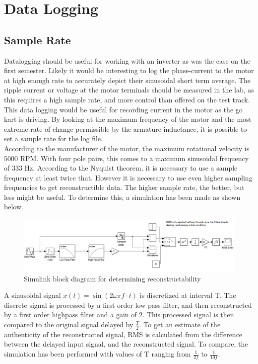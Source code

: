 
\section{Data Logging}
\subsection{Sample Rate}

Datalogging should be useful for working with an inverter as was the case on the first semester.
Likely it would be interesting to log the phase-current to the motor at high enough rate to accurately depict their sinusoidal short term average.
The ripple current or voltage at the motor terminals should be measured in the lab, as this requires a high sample rate, and more control than offered on the test track.
This data logging would be useful for recording current in the motor as the go kart is driving.
By looking at the maximum frequency of the motor and the most extreme rate of change permissible by the armature inductance, it is possible to set a sample rate for the log file.\\

According to the manufacturer of the motor, the maximum rotational velocity is 5000 RPM.
With four pole pairs, this comes to a maximum sinusoidal frequency of 333 Hz. 
According to the Nyquist theorem, it is necessary to use a sample frequency at least twice that. 
However it is necessary to use even higher sampling frequencies to get reconstructible data.
The higher sample rate, the better, but less might be useful.
To determine this, a simulation has been made as shown below.\\

\begin{figure}[H]
	\centering
	\includegraphics[width=\textwidth]{graphics/determine_max_frequency.png}
	\caption{Simulink block diagram for determining reconstructability}
	\label{fig:determine_max_frequency}
\end{figure}


A sinusoidal signal $x(t) = \sin(2\omega \pi f \cdot t)$ is discretized at interval T. 
The discrete signal is processed by a first order low pass filter, and then reconstructed by a first order highpass filter and a gain of 2.
This processed signal is then compared to the original signal delayed by $\frac{T}{2}$.
To get an estimate of the authenticity of the reconstructed signal, RMS is calculated from the difference between the delayed input signal, and the reconstructed signal.
To compare, the simulation has been performed with values of T ranging from $\frac{1}{2f}$ to $\frac{1}{10f}$.\\

